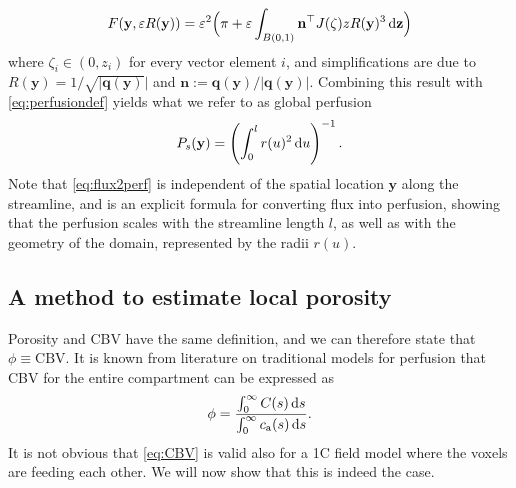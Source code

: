 \documentclass[final,5p,times,twocolumn]{elsarticle}
\begin{document}
	\begin{equation}
		F(\mathbf{y},\varepsilon R(\mathbf{y}))
		= \varepsilon^2 \Big(\pi + \varepsilon \int_{B(0,1)} \mathbf{n}^\top J(\zeta)zR(\mathbf{y})^3 \,\mathrm{d} \mathbf{z} \Big)
	\end{equation}
	where $\zeta_i \in (0,z_i)$ for every vector element $i$, and simplifications are due to $R(\mathbf{y}) = 1/\sqrt{\vert \mathbf{q}(\mathbf{y})} \vert$ and $\mathbf{n}:=\mathbf{q}(\mathbf{y})/\vert \mathbf{q}(\mathbf{y}) \vert$.
	Combining this result with \eqref{eq:perfusiondef} yields what we refer to as global perfusion
	\begin{equation}\label{eq:flux2perf}
		P_s(\mathbf{y}) = \left(\int_0^l r(u)^2 \,\mathrm{d} u\right)^{-1}.
	\end{equation}
	Note that \eqref{eq:flux2perf} is independent of the spatial location $\mathbf{y}$ along the streamline, and is an explicit formula for converting flux into perfusion, showing that the perfusion scales with the streamline length $l$, as well as with the geometry of the domain, represented by the radii $r(u)$.


	\subsection{A method to estimate local porosity}\label{sec:CBV}

	Porosity and CBV have the same definition, and we can therefore state that $\phi \equiv \mathrm{CBV}$. It is known from literature on traditional models \cite{sourbron13} for perfusion that CBV for the entire compartment can be expressed as
	\begin{equation}
		\phi = \frac{\int_0^\infty C(s) \,\mathrm{d} s}{\int_0^\infty c_\mathrm{a}(s) \,\mathrm{d} s}.
		\label{eq:CBV}
	\end{equation}
	It is not obvious that \eqref{eq:CBV} is valid also for a 1C field model where the voxels are feeding each other. 
	We will now show that this is indeed the case.
	
\end{document}
